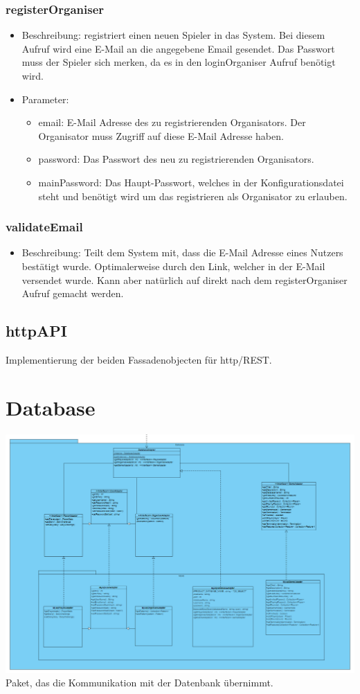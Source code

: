 \documentclass[a4paper]{scrreprt}
\begin{document}
	\subsubsection{registerOrganiser}
    \begin{itemize}
        \item Beschreibung: registriert einen neuen Spieler in das System. Bei diesem Aufruf wird eine E-Mail an die angegebene Email gesendet. Das Passwort muss der Spieler sich merken, da es in den loginOrganiser Aufruf benötigt wird.
        \item Parameter:
        \begin{itemize}
            \item email: E-Mail Adresse des zu registrierenden Organisators. Der Organisator muss Zugriff auf diese E-Mail Adresse haben.
            \item password: Das Passwort des neu zu registrierenden Organisators.
            \item mainPassword: Das Haupt-Passwort, welches in der Konfigurationsdatei steht und benötigt wird um das registrieren als Organisator zu erlauben.
        \end{itemize}
    \end{itemize}
    \subsubsection{validateEmail}
    \begin{itemize}
        \item Beschreibung: Teilt dem System mit, dass die E-Mail Adresse eines Nutzers bestätigt wurde. Optimalerweise durch den Link, welcher in der E-Mail versendet wurde. Kann aber natürlich auf direkt nach dem registerOrganiser Aufruf gemacht werden.
    \end{itemize}
    \subsection{httpAPI}
    Implementierung der beiden Fassadenobjecten für http/REST.

	\section{Database}
	\includegraphics[width=\textwidth]{img/Database.PNG}
	Paket, das die Kommunikation mit der Datenbank übernimmt.
\end{document}
